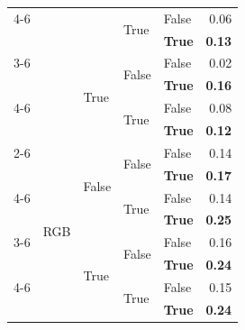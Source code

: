 \begin{tabular}{@{}lllllr@{}}
    \cmidrule{4-6}                  
                                            &                                   &                           & \multirow[c]{2}{*}{True}  & False                 & 0.06 \\
                                            &                                   &                           &                           & \textbf{True}         & \textbf{0.13} \\
    \cmidrule{3-6}                  
                                            &                                   & \multirow[c]{4}{*}{True}  & \multirow[c]{2}{*}{False} & False                 & 0.02 \\
                                            &                                   &                           &                           & \textbf{True}         & \textbf{0.16} \\
    \cmidrule{4-6}                  
                                            &                                   &                           & \multirow[c]{2}{*}{True}  & False                 & 0.08 \\
                                            &                                   &                           &                           & \textbf{True}         & \textbf{0.12} \\
    \cmidrule{2-6}                  
                                            & \multirow[c]{9}{*}{RGB}           & \multirow[c]{4}{*}{False} & \multirow[c]{2}{*}{False} & False                 & 0.14 \\
                                            &                                   &                           &                           & \textbf{True}         & \textbf{0.17} \\
    \cmidrule{4-6}                  
                                            &                                   &                           & \multirow[c]{2}{*}{True}  & False                 & 0.14 \\
                                            &                                   &                           &                           & \textbf{True}         & \textbf{0.25} \\
    \cmidrule{3-6}                  
                                            &                                   & \multirow[c]{4}{*}{True}  & \multirow[c]{2}{*}{False} & False                 & 0.16 \\
                                            &                                   &                           &                           & \textbf{True}         & \textbf{0.24} \\
    \cmidrule{4-6}                  
                                            &                                   &                           & \multirow[c]{2}{*}{True}  & False                 & 0.15 \\
                                            &                                   &                           &                           & \textbf{True}         & \textbf{0.24} \\
    \bottomrule
\end{tabular}
